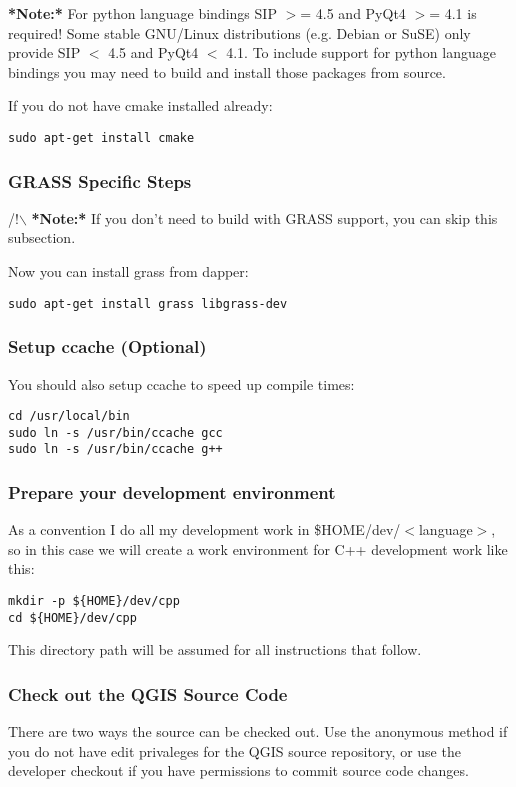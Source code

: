 \textbf{*Note:*} For python language bindings SIP $>$= 4.5 and PyQt4 $>$= 4.1 is required! Some stable GNU/Linux
distributions (e.g. Debian or SuSE) only provide SIP $<$ 4.5 and PyQt4 $<$ 4.1. To include support for python 
language bindings you may need to build and install those packages from source.

If you do not have cmake installed already:

\begin{verbatim}
sudo apt-get install cmake
\end{verbatim}

\hypertarget{toc47}{}
\subsubsection{GRASS Specific Steps}
/!$\backslash$ \textbf{*Note:*} If you don't need to build with GRASS support,  you can
skip this subsection.

Now you can install grass from dapper:

\begin{verbatim}
sudo apt-get install grass libgrass-dev 
\end{verbatim}

\hypertarget{toc48}{}
\subsubsection{Setup ccache (Optional)}
You should also setup ccache to speed up compile times:

\begin{verbatim}
cd /usr/local/bin 
sudo ln -s /usr/bin/ccache gcc 
sudo ln -s /usr/bin/ccache g++ 
\end{verbatim}

\hypertarget{toc49}{}
\subsubsection{Prepare your development environment}
As a convention I do all my development work in \$HOME/dev/$<$language$>$, so in
this case we will create a work environment for C++ development work like
this:

\begin{verbatim}
mkdir -p ${HOME}/dev/cpp 
cd ${HOME}/dev/cpp 
\end{verbatim}

This directory path will be assumed for all instructions that follow.

\hypertarget{toc50}{}
\subsubsection{Check out the QGIS Source Code}
There are two ways the source can be checked out. Use the anonymous method
if you do not have edit privaleges for the QGIS source repository, or use
  the developer checkout if you have permissions to commit source code
  changes.

